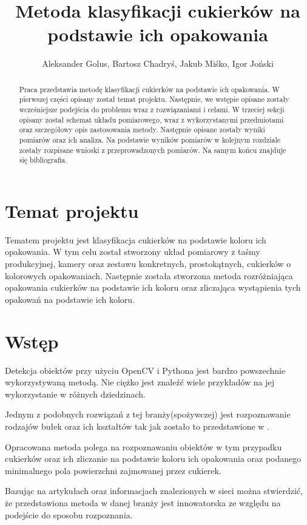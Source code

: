 \documentclass{article}
\title{Metoda klasyfikacji cukierków na podstawie ich opakowania}
\author{Aleksander Golus, Bartosz Chadryś, Jakub Miśko, Igor Joński}
\begin{document}
\maketitle

\begin{abstract}
Praca przedstawia metodę klasyfikacji cukierków na podstawie ich opakowania. W pierwszej części opisany został temat projektu. Następnie, we wstępie opisane zostały wcześniejsze podejścia do problemu wraz z rozwiązaniami i celami. W trzeciej sekcji opisany został schemat układu pomiarowego, wraz z wykorzystanymi przedmiotami oraz szczegółowy opis zastosowania metody. Następnie opisane zostały wyniki pomiarów oraz ich analiza. Na podstawie wyników pomiarów w kolejnym rozdziale zostały rozpisane wnioski z przeprowadzonych pomiarów. Na samym końcu znajduje się bibliografia.
\end{abstract}

\section{Temat projektu}
\label{Temat projektu}
Tematem projektu jest klasyfikacja cukierków na podstawie koloru ich opakowania. W tym celu został stworzony układ pomiarowy z taśmy produkcyjnej, kamery oraz zestawu konkretnych, prostokątnych, cukierków o kolorowych opakowaniach. Następnie została stworzona metoda rozróżniająca opakowania cukierków na podstawie ich koloru oraz zliczająca wystąpienia tych opakowań na podstawie ich koloru.

\section{Wstęp}
\label{Wstęp}
Detekcja obiektów przy użyciu OpenCV i Pythona jest bardzo powszechnie wykorzystywaną metodą. Nie ciężko jest znaleźć wiele przykładów na jej wykorzystanie w różnych dziedzinach.

Jednym z podobnych rozwiązań z tej branży(spożywczej) jest rozpoznawanie rodzajów bułek oraz ich kształtów tak jak zostało to przedstawione w \cite{virtuslab}.

Opracowana metoda polega na rozpoznawaniu obiektów w tym przypadku cukierków oraz ich zliczanie na podstawie koloru ich opakowania oraz podanego minimalnego pola powierzchni zajmowanej przez cukierek.

Bazując na artykułach oraz informacjach znalezionych w sieci można stwierdzić, że przedstawiona metoda w danej branży jest innowatorska ze względu na podejście do sposobu rozpoznania.
\end{document}
